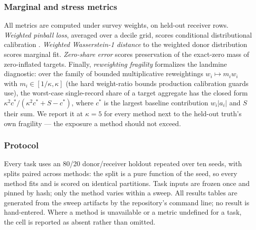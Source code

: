 \subsubsection{Marginal and stress metrics}
\label{imp:sec:metrics}

All metrics are computed under survey weights, on held-out receiver rows.
\emph{Weighted pinball loss}, averaged over a decile grid, scores conditional
distributional calibration \citep{koenker2005quantile}. \emph{Weighted
Wasserstein-1 distance} to the weighted donor distribution scores marginal
fit. \emph{Zero-share error} scores preservation of the exact-zero mass of
zero-inflated targets. Finally, \emph{reweighting fragility} formalizes the
landmine diagnostic: over the family of bounded multiplicative reweightings
$w_i \mapsto m_i w_i$ with $m_i \in [1/\kappa, \kappa]$ (the hard weight-ratio
bounds production calibration guards use), the worst-case single-record share
of a target aggregate has the closed form
$\kappa^2 c^* / (\kappa^2 c^* + S - c^*)$, where $c^*$ is the largest baseline
contribution $w_i |a_i|$ and $S$ their sum. We report it at $\kappa = 5$ for
every method next to the held-out truth's own fragility --- the exposure a
method should not exceed.

\subsubsection{Protocol}
\label{imp:sec:protocol}

Every task uses an 80/20 donor/receiver holdout repeated over ten seeds, with
splits paired across methods: the split is a pure function of the seed, so
every method fits and is scored on identical partitions. Task inputs are
frozen once and pinned by hash; only the method varies within a sweep. All
results tables are generated from the sweep artifacts by the repository's
command line; no result is hand-entered. Where a method is unavailable or a
metric undefined for a task, the cell is reported as absent rather than
omitted.

